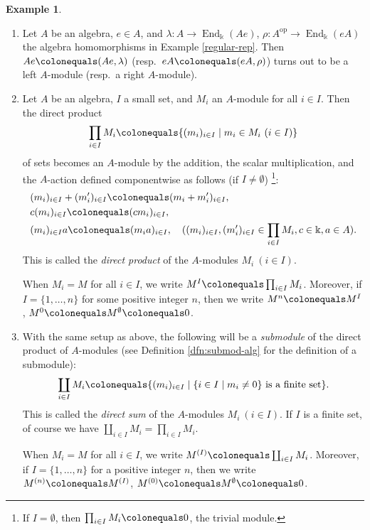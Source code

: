 \documentclass{surv-l}
\numberwithin{equation}{chapter}
\numberwithin{figure}{chapter}
\theoremstyle{plain}
\theoremstyle{definition}
\newtheorem{exm}[thm]{Example}
\theoremstyle{remark}
\DeclareMathOperator{\End}{End}
\begin{document}
\begin{exm}\leavevmode
\label{exm:alg-mod-dprod-dsum}
\begin{enumerate}
\item
Let $A$ be an algebra, $e \in A$, and
$\lambda \colon A \to \End_{\Bbbk}(Ae)$,
$\rho \colon A^{\mathrm{op}} \to \End_{\Bbbk}(eA)$
the algebra homomorphisms in Example \ref{regular-rep}.
Then $Ae\colonequals (Ae, \lambda)$ (resp.\ $eA\colonequals (eA, \rho)$) turns out to be a left $A$-module
(resp.\ a right $A$-module).

\item
Let $A$ be an algebra, $I$ a small set, and $M_i$ an $A$-module for all $i \in I$.
Then the direct product
\[
\prod_{i\in I}M_i\colonequals \{(m_i)_{i\in I}\mid m_i \in M_i
\ (i \in I)\}
\]
of sets becomes an $A$-module by the addition, the scalar multiplication,
and the $A$-action defined componentwise as follows
(if $I \ne \emptyset$)
\footnote{
If $I = \emptyset$, then
$\prod_{i\in I}M_i \colonequals  0$, the trivial module.
}:
\[
\begin{aligned}
&(m_i)_{i\in I} + (m'_i)_{i\in I}\colonequals  (m_i+m'_i)_{i\in I},\\
&c(m_i)_{i\in I}\colonequals (cm_i)_{i\in I},\\
&(m_i)_{i\in I}a\colonequals (m_ia)_{i\in I},
\quad(
(m_i)_{i\in I}, (m'_i)_{i\in I}\in \prod_{i\in I}M_i,
c \in \Bbbk, a\in A
).
\end{aligned}
\]
This is called the \emph{direct product} of the $A$-modules $M_i\ (i \in I)$.

When $M_i = M$ for all $i\in I$, we write $M^I\colonequals \prod_{i\in I}M_i$.
Moreover, if $I=\{1,\dots, n\}$ for some positive integer $n$, then we write $M^n\colonequals M^I$,
$M^0\colonequals  M^\emptyset \colonequals  0$.

\item
With the same setup as above, the following will be a \emph{submodule} of the direct product of $A$-modules (see Definition \ref{dfn:submod-alg} for the definition of a submodule):
\[
\coprod_{i\in I}M_i\colonequals \{(m_i)_{i \in I}\mid
\{i \in I \mid m_i \ne 0\}\text{ is a finite set}\}.
\]
This is called the \emph{direct sum} of the $A$-modules $M_i\ (i \in I)$.
If $I$ is a finite set, of course we have
$\coprod_{i\in I}M_i=\prod_{i\in I}M_i$.

When $M_i = M$ for all $i\in I$, we write $M^{(I)}\colonequals \coprod_{i\in I}M_i$.
Moreover, if $I=\{1,\dots, n\}$
for a positive integer $n$, then we write $M^{(n)}\colonequals M^{(I)}$,
$M^{(0)}\colonequals  M^\emptyset \colonequals  0$.
\end{enumerate}
\end{exm}
\end{document}
